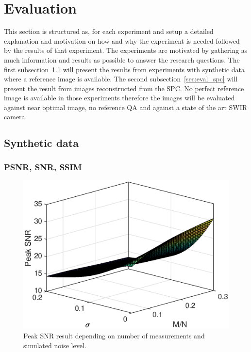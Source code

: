 \section{Evaluation}
\label{sec:Evaluation}
This section is structured as, for each experiment and setup a detailed explanation and motivation on how and why the experiment is needed followed by the results of that experiment. The experiments are motivated by gathering as much information and results as possible to answer the research questions. The first subsection~\ref{sec:SD} will present the results from experiments with synthetic data where a reference image is available. The second subsection~\ref{sec:eval_spc} will present the result from images reconstructed from the SPC. No perfect reference image is available in those experiments therefore the images will be evaluated against near optimal image, no reference QA and against a state of the art SWIR camera. 



\subsection{Synthetic data}
\label{sec:SD}

\subsubsection{PSNR, SNR, SSIM}

\begin{figure}[H]
    \centering
    \includegraphics[width = 0.7\linewidth]{result/synt_sss/PSNR_fit.eps}
    \caption{Peak SNR result depending on number of measurements and simulated noise level.}
    \label{fig:psnr_3d}
\end{figure}

